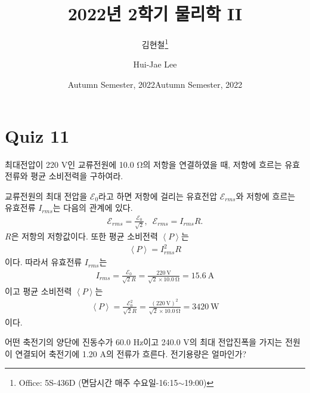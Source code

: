 \documentclass[tightenlines,floatfix,nofootinbib,superscriptaddress,fleqn]{revtex4}
\begin{document}
\title{\Large 2022년 2학기 물리학 II}
\author{김현철\footnote{Office: 5S-436D (면담시간 매주
    수요일-16:15$\sim$19:00)}} 
\date{Autumn Semester, 2022}
\author{Hui-Jae Lee} 
\date{Autumn Semester, 2022}

\maketitle



\section*{\large Quiz 11}
최대전압이 220 V인 교류전원에 10.0 $\mathrm{\Omega}$의 저항을 연결하였을 때,
저항에 흐르는 유효전류와 평균 소비전력을 구하여라.

교류전원의 최대 전압을 $\mathcal{E}_0$라고 하면 저항에 걸리는 유효전압 $\mathcal{E}_{rms}$와
저항에 흐르는 유효전류 $I_{rms}$는 다음의 관계에 있다.
\begin{align}
  \mathcal{E}_{rms} = \frac{\mathcal{E}_0}{\sqrt{2}},\,\,\,
  \mathcal{E}_{rms} = I_{rms}R.
\end{align}
$R$은 저항의 저항값이다. 또한 평균 소비전력 $\left<P\right>$는
\begin{align}
  \left<P\right> = I_{rms}^2R
\end{align}
이다. 따라서 유효전류 $I_{rms}$는
\begin{align}
  I_{rms} = \frac{\mathcal{E}_0}{\sqrt{2}R}=
  \frac{220~\mathrm{V}}{\sqrt{2}\times 10.0~\mathrm{\Omega}} = 15.6~\mathrm{A}
\end{align}
이고 평균 소비전력  $\left<P\right>$는
\begin{align}
  \left<P\right> = \frac{\mathcal{E}^2_0}{\sqrt{2}R}
  =\frac{(220~\mathrm{V})^2}{\sqrt{2}\times 10.0~\mathrm{\Omega}}
  =3420~\mathrm{W}
\end{align}
이다.
\vspace{1cm}

어떤 축전기의 양단에 진동수가 60.0 Hz이고 240.0 V의 최대 전압진폭을
가지는 전원이 연결되어 축전기에 1.20 A의 전류가 흐른다. 전기용량은 얼마인가?
\end{document}
